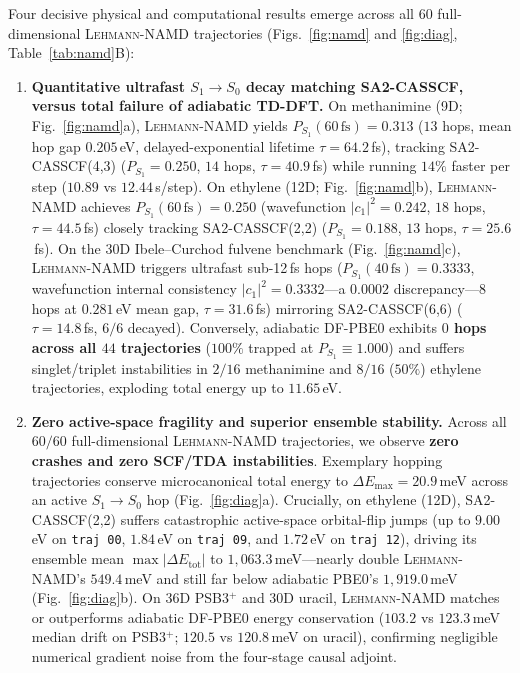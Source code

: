 \documentclass[10pt,twocolumn]{article}
\theoremstyle{natthm}
\newcommand{\leh}{\textsc{Lehmann-NAMD}}
\begin{document}
Four decisive physical and computational results emerge across all 60 full-dimensional \leh{} trajectories (Figs.~\ref{fig:namd} and \ref{fig:diag}, Table~\ref{tab:namd}B):
\begin{enumerate}
  \setlength{\itemsep}{1pt}
  \item \textbf{Quantitative ultrafast $S_1\to S_0$ decay matching SA2-CASSCF, versus total failure of adiabatic TD-DFT.} On methanimine (9D; Fig.~\ref{fig:namd}a), \leh{} yields $P_{S_1}(60\,\mathrm{fs})=0.313$ ($13$ hops, mean hop gap $0.205$\,eV, delayed-exponential lifetime $\tau=64.2$\,fs), tracking SA2-CASSCF(4,3) ($P_{S_1}=0.250$, $14$ hops, $\tau=40.9$\,fs)\cite{barbatti2006methanimine} while running $14\%$ faster per step ($10.89$ vs $12.44$\,s/step). On ethylene (12D; Fig.~\ref{fig:namd}b), \leh{} achieves $P_{S_1}(60\,\mathrm{fs})=0.250$ (wavefunction $|c_1|^2=0.242$, $18$ hops, $\tau=44.5$\,fs) closely tracking SA2-CASSCF(2,2) ($P_{S_1}=0.188$, $13$ hops, $\tau=25.6$\,fs)\cite{bennun2000ethylene,barbatti2004ethylene}. On the 30D Ibele--Curchod fulvene benchmark\cite{ibele2020fulvene} (Fig.~\ref{fig:namd}c), \leh{} triggers ultrafast sub-12\,fs hops ($P_{S_1}(40\,\mathrm{fs})=0.3333$, wavefunction internal consistency $|c_1|^2=0.3332$---a $0.0002$ discrepancy---$8$ hops at $0.281$\,eV mean gap, $\tau=31.6$\,fs) mirroring SA2-CASSCF(6,6) ($\tau=14.8$\,fs, $6/6$ decayed). Conversely, adiabatic DF-PBE0 exhibits \textbf{$0$ hops across all $44$ trajectories} ($100\%$ trapped at $P_{S_1}\equiv 1.000$) and suffers singlet/triplet instabilities in $2/16$ methanimine and $8/16$ ($50\%$) ethylene trajectories, exploding total energy up to $11.65$\,eV.
  \item \textbf{Zero active-space fragility and superior ensemble stability.} Across all $60/60$ full-dimensional \leh{} trajectories, we observe \textbf{zero crashes and zero SCF/TDA instabilities}. Exemplary hopping trajectories conserve microcanonical total energy to $\Delta E_{\max}=20.9$\,meV across an active $S_1\to S_0$ hop (Fig.~\ref{fig:diag}a). Crucially, on ethylene (12D), SA2-CASSCF(2,2) suffers catastrophic active-space orbital-flip jumps (up to $9.00$\,eV on \texttt{traj 00}, $1.84$\,eV on \texttt{traj 09}, and $1.72$\,eV on \texttt{traj 12}), driving its ensemble mean $\max|\Delta E_{\mathrm{tot}}|$ to $1{,}063.3$\,meV---nearly double \leh{}'s $549.4$\,meV and still far below adiabatic PBE0's $1{,}919.0$\,meV (Fig.~\ref{fig:diag}b). On 36D PSB3$^+$ and 30D uracil, \leh{} matches or outperforms adiabatic DF-PBE0 energy conservation ($103.2$ vs $123.3$\,meV median drift on PSB3$^+$; $120.5$ vs $120.8$\,meV on uracil), confirming negligible numerical gradient noise from the four-stage causal adjoint.

\end{enumerate}
\end{document}

